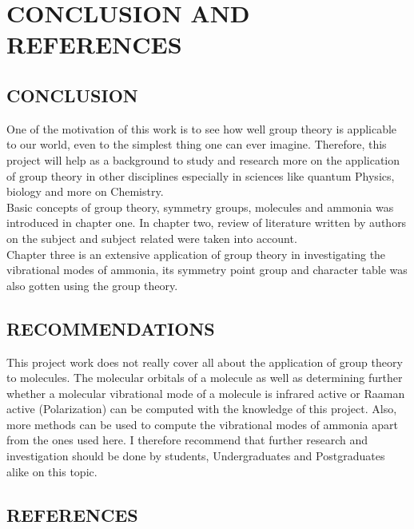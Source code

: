 \documentclass[a4paper, 12pt, openany]{report}
\begin{document}
	\chapter{CONCLUSION AND  REFERENCES}
	\section{CONCLUSION}
	One of the motivation of this work is to see how well group theory is applicable to our world, even to the simplest thing one can ever imagine. Therefore, this project will help as a background to study and research more on the \break application of group theory in other disciplines especially in sciences like quantum Physics, biology and more on Chemistry.\\
	Basic concepts of group theory, symmetry groups, molecules and ammonia was introduced in chapter one. In chapter two, review of literature written by authors on the subject and subject related were taken into account.\\Chapter three is an extensive application of group theory in investigating the \linebreak vibrational modes of ammonia,  its symmetry point group and  character table was also gotten using the group theory. 
	\section{RECOMMENDATIONS} 
This project work does not really cover all about the application of group \break theory to molecules. The molecular orbitals of a molecule as well as \break determining further whether a molecular vibrational mode of a molecule is infrared active or Raaman active (Polarization) can be computed with the knowledge of this project. Also, more methods can be used to compute the vibrational modes of ammonia apart from the ones used here. I therefore \break recommend that further research and investigation should be done by \break students, Undergraduates and Postgraduates alike on this topic.
\newpage
	\section*{REFERENCES}
\end{document}
